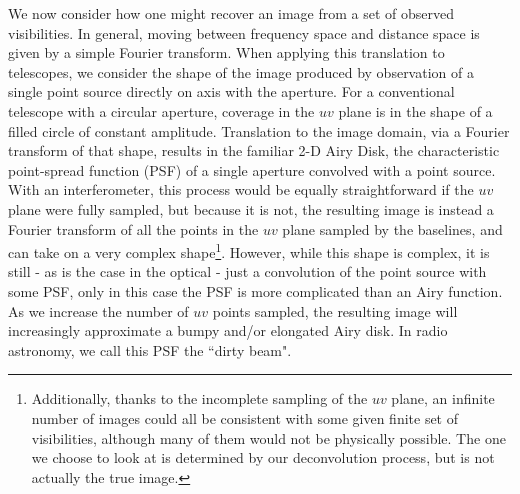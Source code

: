 We now consider how one might recover an image from a set of observed visibilities. In general, moving between frequency space and distance space is given by a simple Fourier transform. When applying this translation to telescopes, we consider the shape of the image produced by observation of a single point source directly on axis with the aperture. For a conventional telescope with a circular aperture, coverage in the $uv$ plane is in the shape of a filled circle of constant amplitude. Translation to the image domain, via a Fourier transform of that shape, results in the familiar 2-D Airy Disk, the characteristic point-spread function (PSF) of a single aperture convolved with a point source. With an interferometer, this process would be equally straightforward if the $uv$ plane were fully sampled, but because it is not, the resulting image is instead a Fourier transform of all the points in the $uv$ plane sampled by the baselines, and can take on a very complex shape\footnote{Additionally, thanks to the incomplete sampling of the $uv$ plane, an infinite number of images could all be consistent with some given finite set of visibilities, although many of them would not be physically possible. The one we choose to look at is determined by our deconvolution process, but is not actually the true image.}. However, while this shape is complex, it is still - as is the case in the optical - just a convolution of the point source with some PSF, only in this case the PSF is more complicated than an Airy function. As we increase the number of $uv$ points sampled, the resulting image will increasingly approximate a bumpy and/or elongated Airy disk. In radio astronomy, we call this PSF the ``dirty beam".


